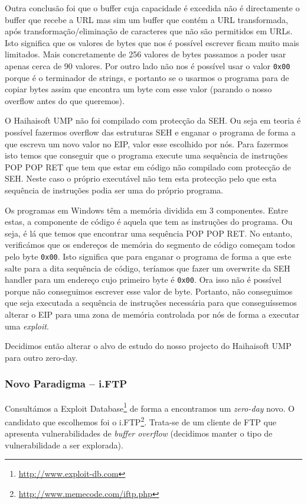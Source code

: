 \documentclass[a4paper]{article}
\begin{document}
Outra conclusão foi que o buffer cuja capacidade é excedida não é directamente o buffer que recebe a URL mas sim um buffer que contém a URL transformada, após transformação/eliminação de caracteres que não são permitidos em URLs. Isto significa que os valores de bytes que nos é possível escrever ficam muito mais limitados. Mais concretamente de 256 valores de bytes passamos a poder usar apenas cerca de 90 valores. Por outro lado não nos é possível usar o valor \texttt{0x00} porque é o terminador de strings, e portanto se o usarmos o programa para de copiar bytes assim que encontra um byte com esse valor (parando o nosso overflow antes do que queremos).

O Haihaisoft UMP não foi compilado com protecção da SEH. Ou seja em teoria é possível fazermos overflow das estruturas SEH e enganar o programa de forma a que escreva um novo valor no EIP, valor esse escolhido por nós. Para fazermos isto temos que conseguir que o programa execute uma sequência de instruções POP POP RET que tem que estar em código não compilado com protecção de SEH. Neste caso o próprio executável não tem esta protecção pelo que esta sequência de instruções podia ser uma do próprio programa.

Os programas em Windows têm a memória dividida em 3 componentes. Entre estas, a componente de código é aquela que tem as instruções do programa. Ou seja, é lá que temos que encontrar uma sequência POP POP RET. No entanto, verificámos que os endereços de memória do segmento de código começam todos pelo byte \texttt{0x00}. Isto significa que para enganar o programa de forma a que este salte para a dita sequência de código, teríamos que fazer um overwrite da SEH handler para um endereço cujo primeiro byte é \texttt{0x00}. Ora isso não é possível porque não conseguimos escrever esse valor de byte. Portanto, não conseguimos que seja executada a sequência de instruções necessária para que conseguíssemos alterar o EIP para uma zona de memória controlada por nós de forma a executar uma \textit{exploit}.

Decidimos então alterar o alvo de estudo do nosso projecto do Haihaisoft UMP para outro zero-day.


\subsubsection{Novo Paradigma -- i.FTP}
Consultámos a Exploit Database\footnote{\url{http://www.exploit-db.com}} de forma a encontramos um \textit{zero-day} novo. O candidato que escolhemos foi o i.FTP\footnote{\url{http://www.memecode.com/iftp.php}}. Trata-se de um cliente de FTP que apresenta vulnerabilidades de \textit{buffer overflow} (decidimos manter o tipo de vulnerabilidade a ser explorada).
\end{document}
